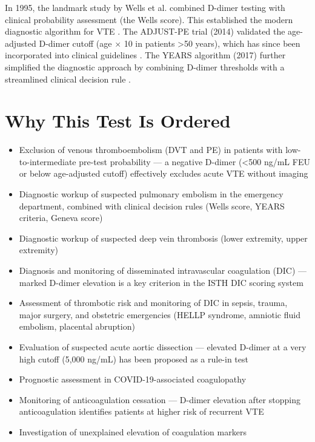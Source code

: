 In 1995, the landmark study by Wells et al. combined D-dimer testing with clinical probability assessment (the Wells score). This established the modern diagnostic algorithm for VTE \cite{wells2003evaluation}. The ADJUST-PE trial (2014) validated the age-adjusted D-dimer cutoff (age $\times$ 10 in patients >50 years), which has since been incorporated into clinical guidelines \cite{righini2014ageadjusted}. The YEARS algorithm (2017) further simplified the diagnostic approach by combining D-dimer thresholds with a streamlined clinical decision rule \cite{vanderhulle2017simplified}.

\section*{Why This Test Is Ordered}
\begin{itemize}
  \item Exclusion of venous thromboembolism (DVT and PE) in patients with low-to-intermediate pre-test probability --- a negative D-dimer (<500 ng/mL FEU or below age-adjusted cutoff) effectively excludes acute VTE without imaging
  \item Diagnostic workup of suspected pulmonary embolism in the emergency department, combined with clinical decision rules (Wells score, YEARS criteria, Geneva score)
  \item Diagnostic workup of suspected deep vein thrombosis (lower extremity, upper extremity)
  \item Diagnosis and monitoring of disseminated intravascular coagulation (DIC) --- marked D-dimer elevation is a key criterion in the ISTH DIC scoring system
  \item Assessment of thrombotic risk and monitoring of DIC in sepsis, trauma, major surgery, and obstetric emergencies (HELLP syndrome, amniotic fluid embolism, placental abruption)
  \item Evaluation of suspected acute aortic dissection --- elevated D-dimer at a very high cutoff (5,000 ng/mL) has been proposed as a rule-in test
  \item Prognostic assessment in COVID-19-associated coagulopathy
  \item Monitoring of anticoagulation cessation --- D-dimer elevation after stopping anticoagulation identifies patients at higher risk of recurrent VTE
  \item Investigation of unexplained elevation of coagulation markers
\end{itemize}

